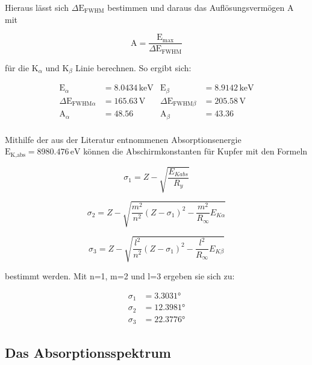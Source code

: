 \noindent
Hieraus lässt sich $\Delta\text{E}_{\text{FWHM}}$ bestimmen und daraus das Auflösungsvermögen A mit 

\begin{equation*}
\text{A}=\frac{\text{E}_{\text{max}}}{\Delta\text{E}_{\text{FWHM}}}
\end{equation*}

\noindent
für die $\text{K}_\alpha$ und $\text{K}_\beta$ Linie berechnen.
So ergibt sich:

\begin{align*}
\text{E}_\alpha&=8.0434 \, \mathrm{keV}   &\text{E}_\beta&=8.9142 \, \mathrm{keV} \\
\Delta\text{E}_{\text{FWHM}\alpha}&=165.63 \, \mathrm{V}   &\Delta\text{E}_{\text{FWHM}\beta}&=205.58 \, \mathrm{V} \\
\text{A}_\alpha&=48.56  &\text{A}_\beta&=43.36 \\
\end{align*}

\noindent
Mithilfe der aus der Literatur entnommenen Absorptionsenergie $\text{E}_\text{K,abs} = 8980.476 \, \mathrm{eV}$ 
können die Abschirmkonstanten für Kupfer mit den Formeln 

\begin{equation*}
\sigma_1=Z-\sqrt{\frac{E_{Kabs}}{R_y}}
\end{equation*}

\begin{equation*}
\sigma_2=Z-\sqrt{ \frac{m^2}{n^2}(Z-\sigma_1)^2 - \frac{m^2}{R_\infty} E_{K\alpha}}
\end{equation*}

\begin{equation*}
    \sigma_3=Z-\sqrt{ \frac{l^2}{n^2}(Z-\sigma_1)^2 - \frac{l^2}{R_\infty} E_{K\beta}}
\end{equation*}
    


\noindent
bestimmt werden. Mit n=1, m=2 und l=3 ergeben sie sich zu:

\begin{align*}
    \sigma_1 &= 3.3031° \\
    \sigma_2 &= 12.3981°\\
    \sigma_3 &= 22.3776°
\end{align*}

\subsection{Das Absorptionsspektrum}

